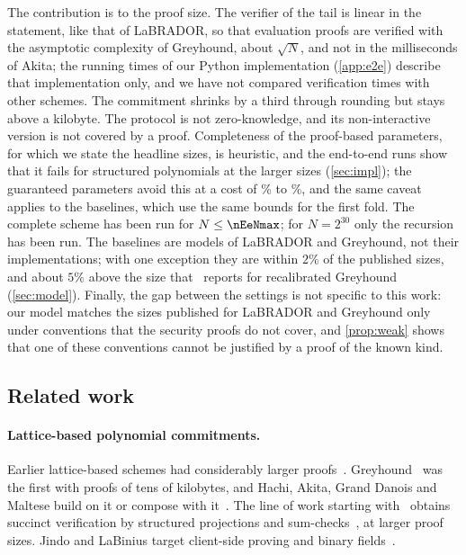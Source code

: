 The contribution is to the proof size. The verifier of the tail is linear in the statement, like that of LaBRADOR, so that evaluation proofs are verified with the asymptotic complexity of Greyhound, about $\sqrt N$, and not in the milliseconds of Akita; the running times of our Python implementation (\cref{app:e2e}) describe that implementation only, and we have not compared verification times with other schemes. The commitment shrinks by a third through rounding but stays above a kilobyte. The protocol is not zero-knowledge, and its non-interactive version is not covered by a proof. Completeness of the proof-based parameters, for which we state the headline sizes, is heuristic, and the end-to-end runs show that it fails for structured polynomials at the larger sizes (\cref{sec:impl}); the guaranteed parameters avoid this at a cost of \nGPctLo\% to \nGPctHi\%, and the same caveat applies to the baselines, which use the same bounds for the first fold. The complete scheme has been run for $N\le\nEeNmax$; for $N=2^{30}$ only the recursion has been run. The baselines are models of LaBRADOR and Greyhound, not their implementations; with one exception they are within $2\%$ of the published sizes, and about $5\%$ above the size that~\cite{DBK26} reports for recalibrated Greyhound (\cref{sec:model}). Finally, the gap between the settings is not specific to this work: our model matches the sizes published for LaBRADOR and Greyhound only under conventions that the security proofs do not cover, and \cref{prop:weak} shows that one of these conventions cannot be justified by a proof of the known kind.

\subsection{Related work}

\paragraph{Lattice-based polynomial commitments.}
Earlier lattice-based schemes had considerably larger proofs~\cite{AFLN24,CMNW24,HSS24}. Greyhound~\cite{NS24} was the first with proofs of tens of kilobytes, and Hachi, Akita, Grand Danois and Maltese build on it or compose with it~\cite{NOZ26,DBK26,KK26,CNT26}. The line of work starting with~\cite{KLNO24} obtains succinct verification by structured projections and sum-checks~\cite{KLNO25,KLOT25,KLNOT26}, at larger proof sizes. Jindo and LaBinius target client-side proving and binary fields~\cite{HLSS26,OS26}.

